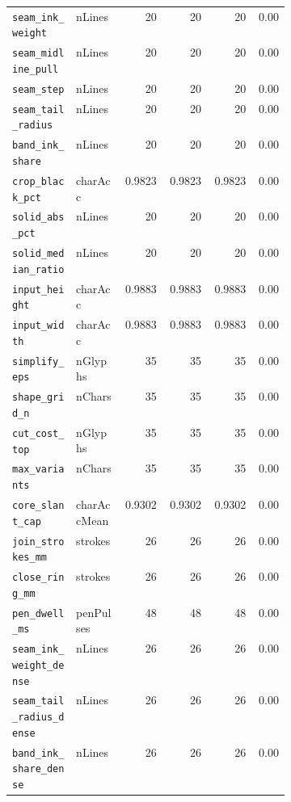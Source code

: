 \begin{longtable}{p{0.23\linewidth}p{0.17\linewidth}rrrr}
\texttt{seam\_ink\_weight} & \textsf{nLines} & 20 & 20 & 20 & 0.00 \\
\texttt{seam\_midline\_pull} & \textsf{nLines} & 20 & 20 & 20 & 0.00 \\
\texttt{seam\_step} & \textsf{nLines} & 20 & 20 & 20 & 0.00 \\
\texttt{seam\_tail\_radius} & \textsf{nLines} & 20 & 20 & 20 & 0.00 \\
\texttt{band\_ink\_share} & \textsf{nLines} & 20 & 20 & 20 & 0.00 \\
\texttt{crop\_black\_pct} & \textsf{charAcc} & 0.9823 & 0.9823 & 0.9823 & 0.00 \\
\texttt{solid\_abs\_pct} & \textsf{nLines} & 20 & 20 & 20 & 0.00 \\
\texttt{solid\_median\_ratio} & \textsf{nLines} & 20 & 20 & 20 & 0.00 \\
\texttt{input\_height} & \textsf{charAcc} & 0.9883 & 0.9883 & 0.9883 & 0.00 \\
\texttt{input\_width} & \textsf{charAcc} & 0.9883 & 0.9883 & 0.9883 & 0.00 \\
\texttt{simplify\_eps} & \textsf{nGlyphs} & 35 & 35 & 35 & 0.00 \\
\texttt{shape\_grid\_n} & \textsf{nChars} & 35 & 35 & 35 & 0.00 \\
\texttt{cut\_cost\_top} & \textsf{nGlyphs} & 35 & 35 & 35 & 0.00 \\
\texttt{max\_variants} & \textsf{nChars} & 35 & 35 & 35 & 0.00 \\
\texttt{core\_slant\_cap} & \textsf{charAccMean} & 0.9302 & 0.9302 & 0.9302 & 0.00 \\
\texttt{join\_strokes\_mm} & \textsf{strokes} & 26 & 26 & 26 & 0.00 \\
\texttt{close\_ring\_mm} & \textsf{strokes} & 26 & 26 & 26 & 0.00 \\
\texttt{pen\_dwell\_ms} & \textsf{penPulses} & 48 & 48 & 48 & 0.00 \\
\texttt{seam\_ink\_weight\_dense} & \textsf{nLines} & 26 & 26 & 26 & 0.00 \\
\texttt{seam\_tail\_radius\_dense} & \textsf{nLines} & 26 & 26 & 26 & 0.00 \\
\texttt{band\_ink\_share\_dense} & \textsf{nLines} & 26 & 26 & 26 & 0.00 \\
\bottomrule
\end{longtable}